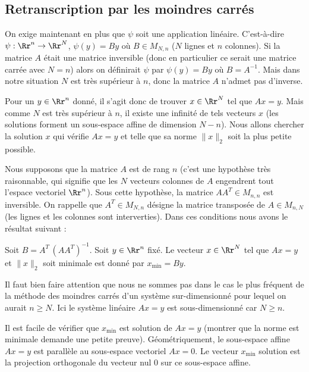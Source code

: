\documentclass[11pt,class=report,crop=false]{standalone}
\begin{document}
\subsection{Retranscription par les moindres carrés}

On exige maintenant en plus que $\psi$ soit une application linéaire.
C'est-à-dire $\psi : \Rr^n \to \Rr^N$, $\psi(y) = By$ où $B \in M_{N,n}$ ($N$ lignes et $n$ colonnes).
Si la matrice $A$ était une matrice inversible (donc en particulier ce serait une matrice carrée avec $N=n$) alors on définirait $\psi$ par $\psi(y) = B y$ où $B = A^{-1}$.
Mais dans notre situation $N$ est très supérieur à $n$, donc la matrice $A$ n'admet pas d'inverse.

Pour un $y \in \Rr^n$ donné, il s'agit donc de trouver $x \in \Rr^N$ tel que $Ax = y$. Mais comme $N$ est très supérieur à $n$, il existe une infinité de tels vecteurs $x$ (les solutions forment un sous-espace affine de dimension $N-n$). Nous allons chercher la solution $x$ qui vérifie $Ax=y$ et telle que sa norme $\| x \|_2$ soit la plus petite possible. 

Nous supposons que la matrice $A$ est de rang $n$ (c'est une hypothèse très raisonnable, qui signifie que les $N$ vecteurs colonnes de $A$ engendrent tout l'espace vectoriel $\Rr^n$). Sous cette hypothèse, la matrice $A A^T \in M_{n,n}$ est inversible. On rappelle que $A^T \in M_{N,n} $ désigne la matrice transposée de $A \in M_{n,N}$ (les lignes et les colonnes sont interverties).
Dans ces conditions nous avons le résultat suivant :
\begin{proposition}
	 Soit $ B = A^T \, (A A^T) ^{-1}$.
	 Soit $y \in \Rr^n$ fixé.
	 Le vecteur $x \in \Rr^N$ tel que $Ax=y$ et $\| x \|_ 2$ soit minimale est donné par $x_{\min} = By$.
\end{proposition}

Il faut bien faire attention que nous ne sommes pas dans le cas le plus fréquent de la méthode des moindres carrés d'un système sur-dimensionné pour lequel on aurait $n \ge N$. Ici le système linéaire $Ax=y$ est sous-dimensionné car $N \ge n$.

Il est facile de vérifier que $x_{\min}$ est solution de $Ax=y$ (montrer que la norme est minimale demande une petite preuve).
Géométriquement, le sous-espace affine $Ax=y$ est parallèle au sous-espace vectoriel $Ax=0$. Le vecteur $x_{\min}$ solution est la projection orthogonale du vecteur nul $0$ sur ce sous-espace affine.
\end{document}
